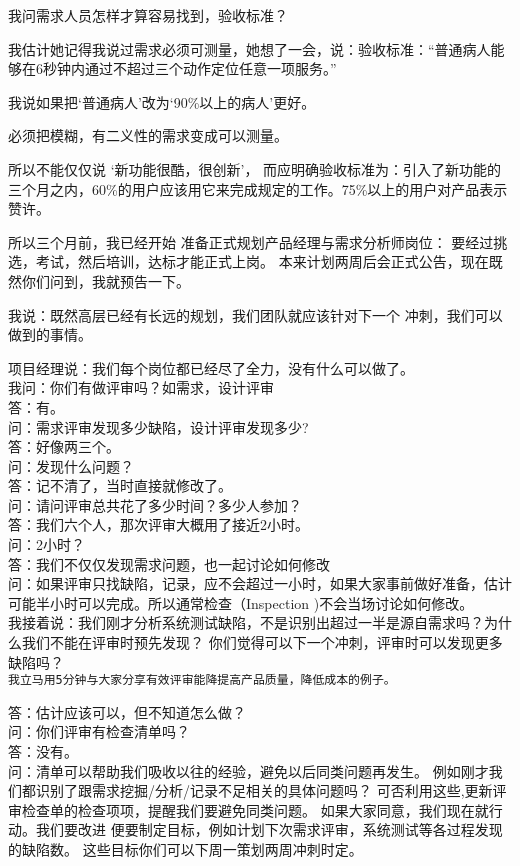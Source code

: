 我问需求人员怎样才算容易找到，验收标准？

我估计她记得我说过需求必须可测量，她想了一会，说：验收标准：``普通病人能够在6秒钟内通过不超过三个动作定位任意一项服务。''

我说如果把`普通病人'改为`90\%以上的病人'更好。

必须把模糊，有二义性的需求变成可以测量。

所以不能仅仅说 `新功能很酷，很创新'，
而应明确验收标准为：引入了新功能的三个月之内，60\%的用户应该用它来完成规定的工作。75\%以上的用户对产品表示赞许。

所以三个月前，我已经开始 准备正式规划产品经理与需求分析师岗位：
要经过挑选，考试，然后培训，达标才能正式上岗。
本来计划两周后会正式公告，现在既然你们问到，我就预告一下。

我说：既然高层已经有长远的规划，我们团队就应该针对下一个
冲刺，我们可以做到的事情。

项目经理说：我们每个岗位都已经尽了全力，没有什么可以做了。\\
我问：你们有做评审吗？如需求，设计评审\\
答：有。\\
问：需求评审发现多少缺陷，设计评审发现多少?\\
答：好像两三个。\\
问：发现什么问题？\\
答：记不清了，当时直接就修改了。\\
问：请问评审总共花了多少时间？多少人参加？\\
答：我们六个人，那次评审大概用了接近2小时。\\
问：2小时？\\
答：我们不仅仅发现需求问题，也一起讨论如何修改\\
问：如果评审只找缺陷，记录，应不会超过一小时，如果大家事前做好准备，估计可能半小时可以完成。所以通常检查（Inspection
)不会当场讨论如何修改。\\
我接着说：我们刚才分析系统测试缺陷，不是识别出超过一半是源自需求吗？为什么我们不能在评审时预先发现？
你们觉得可以下一个冲刺，评审时可以发现更多缺陷吗？\\

\texttt{我立马用5分钟与大家分享有效评审能降提高产品质量，降低成本的例子。}

答：估计应该可以，但不知道怎么做？\\
问：你们评审有检查清单吗？\\
答：没有。\\
问：清单可以帮助我们吸收以往的经验，避免以后同类问题再发生。
例如刚才我们都识别了跟需求挖掘/分析/记录不足相关的具体问题吗？
可否利用这些,更新评审检查单的检查项项，提醒我们要避免同类问题。
如果大家同意，我们现在就行动。我们要改进
便要制定目标，例如计划下次需求评审，系统测试等各过程发现的缺陷数。
这些目标你们可以下周一策划两周冲刺时定。

